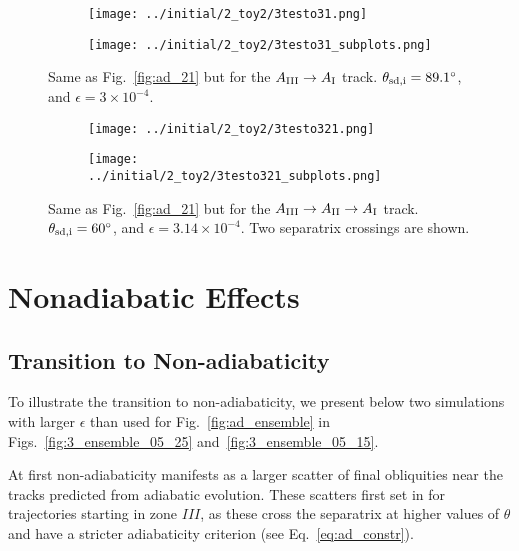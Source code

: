 \documentclass[
        fleqn,
        usenatbib,
        referee,
    ]{mnras}
\begin{document}
\begin{figure}
    \centering
    \begin{subfigure}{\columnwidth}
        \centering
        \texttt{[image: ../initial/2\_toy2/3testo31.png]}
    \end{subfigure}
    \begin{subfigure}{\columnwidth}
        \centering
        \texttt{[image: ../initial/2\_toy2/3testo31\_subplots.png]}
    \end{subfigure}
    \caption{Same as Fig.~\ref{fig:ad_21} but for the $A_{\rm III} \to A_{\rm I}$
    track. $\theta_{\rm sd, i} = 89.1^\circ$, and $\epsilon = 3 \times
    10^{-4}$.}\label{fig:ad_31}
\end{figure}
\begin{figure}
    \centering
    \begin{subfigure}{\columnwidth}
        \centering
        \texttt{[image: ../initial/2\_toy2/3testo321.png]}
    \end{subfigure}
    \begin{subfigure}{\columnwidth}
        \centering
        \texttt{[image: ../initial/2\_toy2/3testo321\_subplots.png]}
    \end{subfigure}
    \caption{Same as Fig.~\ref{fig:ad_21} but for the $A_{\rm III} \to A_{\rm II}
    \to A_{\rm I}$ track. $\theta_{\rm sd, i} = 60^\circ$, and $\epsilon = 3.14
    \times 10^{-4}$. Two separatrix crossings are shown.}\label{fig:ad_321}
\end{figure}

\section{Nonadiabatic Effects}\label{s:nonad}

\subsection{Transition to Non-adiabaticity}\label{ss:transition}

To illustrate the transition to non-adiabaticity, we present below two
simulations with larger $\epsilon$ than used for Fig.~\ref{fig:ad_ensemble} in
Figs.~\ref{fig:3_ensemble_05_25} and~\ref{fig:3_ensemble_05_15}.

At first non-adiabaticity manifests as a larger scatter of final obliquities
near the tracks predicted from adiabatic evolution. These scatters first set in
for trajectories starting in zone $III$, as these cross the separatrix at higher
values of $\theta$ and have a stricter adiabaticity criterion (see
Eq.~\eqref{eq:ad_constr}).
\end{document}
